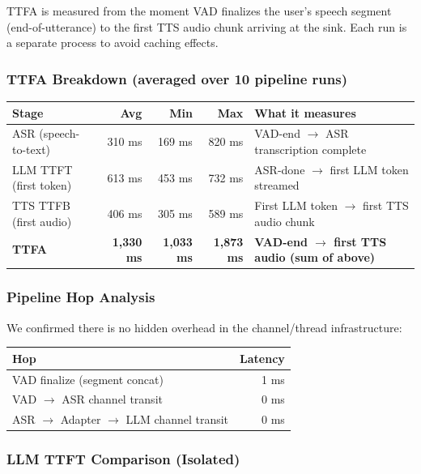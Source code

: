 TTFA is measured from the moment VAD finalizes the user's speech segment (end-of-utterance) to the first TTS audio chunk arriving at the sink. Each run is a separate process to avoid caching effects.

\subsubsection{TTFA Breakdown (averaged over 10 pipeline runs)}

\begin{table}[h]
\centering
\begin{tabular}{|l|r|r|r|l|}
\hline
\textbf{Stage} & \textbf{Avg} & \textbf{Min} & \textbf{Max} & \textbf{What it measures} \\
\hline
ASR (speech-to-text) & 310 ms & 169 ms & 820 ms & VAD-end $\rightarrow$ ASR transcription complete \\
LLM TTFT (first token) & 613 ms & 453 ms & 732 ms & ASR-done $\rightarrow$ first LLM token streamed \\
TTS TTFB (first audio) & 406 ms & 305 ms & 589 ms & First LLM token $\rightarrow$ first TTS audio chunk \\
\textbf{TTFA} & \textbf{1,330 ms} & \textbf{1,033 ms} & \textbf{1,873 ms} & \textbf{VAD-end $\rightarrow$ first TTS audio (sum of above)} \\
\hline
\end{tabular}
\end{table}

\subsubsection{Pipeline Hop Analysis}

We confirmed there is no hidden overhead in the channel/thread infrastructure:

\begin{table}[h]
\centering
\begin{tabular}{|l|r|}
\hline
\textbf{Hop} & \textbf{Latency} \\
\hline
VAD finalize (segment concat) & 1 ms \\
VAD $\rightarrow$ ASR channel transit & 0 ms \\
ASR $\rightarrow$ Adapter $\rightarrow$ LLM channel transit & 0 ms \\
\hline
\end{tabular}
\end{table}

\subsubsection{LLM TTFT Comparison (Isolated)}

